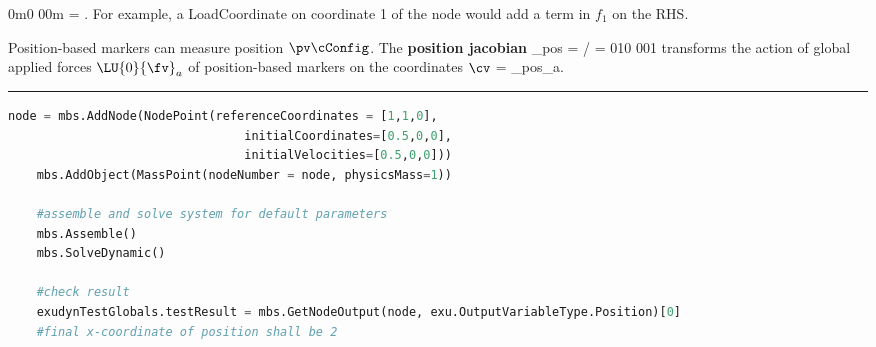     \be 
       {0}{m}{0} {0}{0}{m}  = .
    \ee
    For example, a LoadCoordinate on coordinate 1 of the node would add a term in $f_1$ on the RHS.
    
    Position-based markers can measure position $\pv\cConfig$. The {\bf position jacobian}  
    \be
      \Jm_{pos} = \partial \pv\cCur / \partial \cv\cCur =  {0}{1}{0} {0}{0}{1}
    \ee
    transforms the action of global applied forces $\LU{0}{\fv}_a$ of position-based markers on the coordinates $\cv$
    \be
      \Qm = \Jm_{pos}\tp {}_a.
    \ee
\vspace{6pt}\par\noindent\rule{\textwidth}{0.4pt}
\label{miniExample_ObjectMassPoint}
\pythonstyle
\begin{lstlisting}[language=Python, firstnumber=1]
    node = mbs.AddNode(NodePoint(referenceCoordinates = [1,1,0], 
                                 initialCoordinates=[0.5,0,0],
                                 initialVelocities=[0.5,0,0]))
    mbs.AddObject(MassPoint(nodeNumber = node, physicsMass=1))

    #assemble and solve system for default parameters
    mbs.Assemble()
    mbs.SolveDynamic()

    #check result
    exudynTestGlobals.testResult = mbs.GetNodeOutput(node, exu.OutputVariableType.Position)[0]
    #final x-coordinate of position shall be 2
\end{lstlisting}

